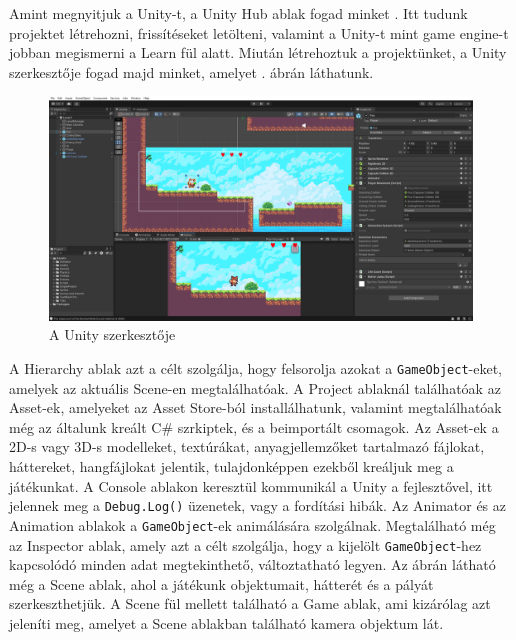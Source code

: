 
Amint megnyitjuk a Unity-t, a Unity Hub ablak fogad minket \cite{unityhub}. Itt tudunk projektet létrehozni, frissítéseket letölteni, valamint a Unity-t mint game engine-t jobban megismerni a Learn fül alatt. Miután létrehoztuk a projektünket, a Unity szerkesztője fogad majd minket, amelyet . ábrán láthatunk.

\begin{figure}[ht]
\centering
\includegraphics[width=\linewidth]{images/unityszerkeszto.png}
\caption{A Unity szerkesztője}
\label{fig:unityszerkeszto}
\end{figure}

A Hierarchy ablak azt a célt szolgálja, hogy felsorolja azokat a \texttt{GameObject}-eket, amelyek az aktuális Scene-en megtalálhatóak. A Project ablaknál találhatóak az Asset-ek, amelyeket az Asset Store-ból installálhatunk, valamint megtalálhatóak még az általunk kreált C\# szrkiptek, és a beimportált csomagok. Az Asset-ek a 2D-s vagy 3D-s modelleket, textúrákat, anyagjellemzőket tartalmazó fájlokat, háttereket, hangfájlokat jelentik, tulajdonképpen ezekből kreáljuk meg a játékunkat. A Console ablakon keresztül kommunikál a Unity a fejlesztővel, itt jelennek meg a \texttt{Debug.Log()} üzenetek, vagy a fordítási hibák. Az Animator és az Animation ablakok a \texttt{GameObject}-ek animálására szolgálnak. Megtalálható még az Inspector ablak, amely azt a célt szolgálja, hogy a kijelölt \texttt{GameObject}-hez kapcsolódó minden adat megtekinthető, változtatható legyen. Az ábrán látható még a Scene ablak, ahol a játékunk objektumait, hátterét és a pályát szerkeszthetjük. A Scene fül mellett található a Game ablak, ami kizárólag azt jeleníti meg, amelyet a Scene ablakban található kamera objektum lát.


